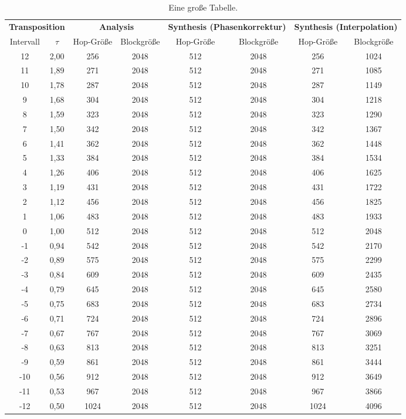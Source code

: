\begin{table}
	\centering
	\begin{tabular}{cccccccc}
		\toprule
		\multicolumn{2}{c}{\textbf{Transposition}} & \multicolumn{2}{c}{\textbf{Analysis}} & \multicolumn{2}{c}{\textbf{Synthesis (Phasenkorrektur)}} & \multicolumn{2}{c}{\textbf{Synthesis (Interpolation)}} \\
		Intervall & \(\tau\) & Hop-Größe & Blockgröße & Hop-Größe & Blockgröße & Hop-Größe & Blockgröße \\
		\midrule
		12&2,00&256&2048&512&2048&256&1024\\
		11&1,89&271&2048&512&2048&271&1085\\
		10&1,78&287&2048&512&2048&287&1149\\
		9&1,68&304&2048&512&2048&304&1218\\
		8&1,59&323&2048&512&2048&323&1290\\
		7&1,50&342&2048&512&2048&342&1367\\
		6&1,41&362&2048&512&2048&362&1448\\
		5&1,33&384&2048&512&2048&384&1534\\
		4&1,26&406&2048&512&2048&406&1625\\
		3&1,19&431&2048&512&2048&431&1722\\
		2&1,12&456&2048&512&2048&456&1825\\
		1&1,06&483&2048&512&2048&483&1933\\
		\midrule
		0&1,00&512&2048&512&2048&512&2048\\
		\midrule
		-1&0,94&542&2048&512&2048&542&2170\\
		-2&0,89&575&2048&512&2048&575&2299\\
		-3&0,84&609&2048&512&2048&609&2435\\
		-4&0,79&645&2048&512&2048&645&2580\\
		-5&0,75&683&2048&512&2048&683&2734\\
		-6&0,71&724&2048&512&2048&724&2896\\
		-7&0,67&767&2048&512&2048&767&3069\\
		-8&0,63&813&2048&512&2048&813&3251\\
		-9&0,59&861&2048&512&2048&861&3444\\
		-10&0,56&912&2048&512&2048&912&3649\\
		-11&0,53&967&2048&512&2048&967&3866\\
		-12&0,50&1024&2048&512&2048&1024&4096\\
		\bottomrule
	\end{tabular}
	\caption{Eine große Tabelle.}
	\label{table:FrameHop}
\end{table}

